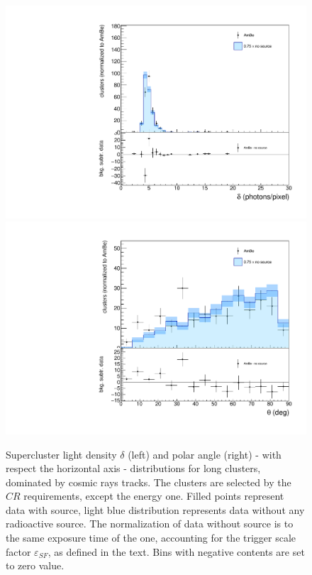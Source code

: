 \begin{figure}[ht]
  \begin{center}
  \includegraphics[width=0.45\linewidth]{figures/density_cosmics}
  \includegraphics[width=0.45\linewidth]{figures/inclination_cosmics}

  \caption{Supercluster light density $\delta$ (left) and polar angle
    (right) - with respect the horizontal axis - distributions for
    long clusters, dominated by cosmic rays tracks. The clusters are
    selected by the $CR$ requirements, except the energy one.  Filled
    points represent data with \ambe source, light blue distribution
    represents data without any radioactive source.  The normalization
    of data without source is to the same exposure time of the \ambe
    one, accounting for the trigger scale factor $\varepsilon_{SF}$,
    as defined in the text. Bins with negative contents are set to
    zero value. \label{fig:cosmics}}

\end{center}
\end{figure}
